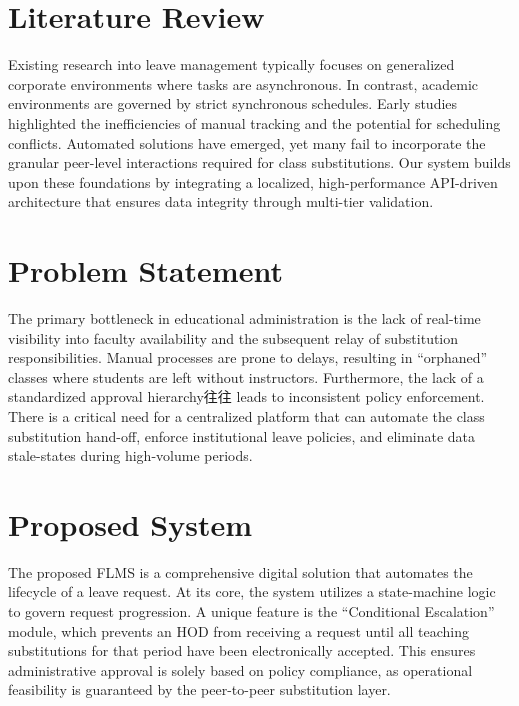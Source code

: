 \documentclass[conference]{IEEEtran}
\begin{document}
\section{Literature Review}
Existing research into leave management typically focuses on generalized corporate environments where tasks are asynchronous. In contrast, academic environments are governed by strict synchronous schedules. Early studies highlighted the inefficiencies of manual tracking and the potential for scheduling conflicts. Automated solutions have emerged, yet many fail to incorporate the granular peer-level interactions required for class substitutions. Our system builds upon these foundations by integrating a localized, high-performance API-driven architecture that ensures data integrity through multi-tier validation.

\section{Problem Statement}
The primary bottleneck in educational administration is the lack of real-time visibility into faculty availability and the subsequent relay of substitution responsibilities. Manual processes are prone to delays, resulting in ``orphaned'' classes where students are left without instructors. Furthermore, the lack of a standardized approval hierarchy往往 leads to inconsistent policy enforcement. There is a critical need for a centralized platform that can automate the class substitution hand-off, enforce institutional leave policies, and eliminate data stale-states during high-volume periods.

\section{Proposed System}
The proposed FLMS is a comprehensive digital solution that automates the lifecycle of a leave request. At its core, the system utilizes a state-machine logic to govern request progression. A unique feature is the ``Conditional Escalation'' module, which prevents an HOD from receiving a request until all teaching substitutions for that period have been electronically accepted. This ensures administrative approval is solely based on policy compliance, as operational feasibility is guaranteed by the peer-to-peer substitution layer.
\end{document}
